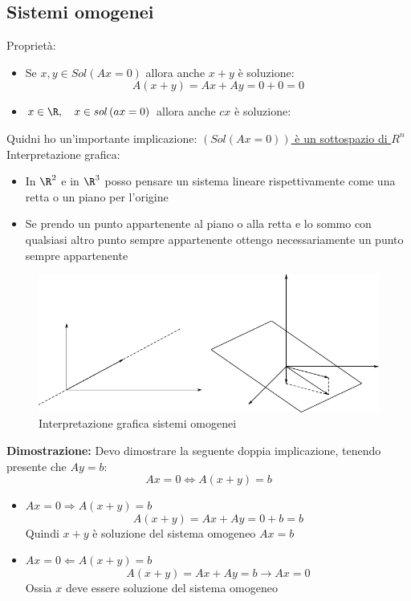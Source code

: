\documentclass[12pt,a4paper,oneside]{article}
\begin{document}
\subsection{Sistemi omogenei}
Proprietà:
\begin{itemize}
	\item Se $x,y \in  Sol\left( Ax=0 \right) $ allora anche $x+y$ è soluzione:
	      \[
		      A\left( x+y \right)  = Ax + Ay = 0 + 0 = 0
	      \]
	\item $x \in  \R, \quad  x \in  sol \left(  ax = 0 \right) $ allora anche $cx$ è soluzione:
\end{itemize}
Quidni ho un'importante implicazione:  \underline{ $ \left( Sol\left( Ax=0 \right)  \right) $ è un sottospazio di $R^{n}$}
\vskip3mm
Interpretazione grafica:
\begin{itemize}
	\item In $\R^{2}$ e in $\R^{3}$ posso pensare un sistema lineare rispettivamente come una retta o un piano per l'origine
	\item Se prendo un punto appartenente al piano o alla retta e lo sommo con qualsiasi altro punto sempre appartenente ottengo necessariamente un punto sempre appartenente
\end{itemize}
\begin{figure}[H]
	\centering
	\includegraphics{Images/Sistemi omogenei.pdf}
	\caption{Interpretazione grafica sistemi omogenei}
\end{figure}
\textbf{Dimostrazione:}
Devo dimostrare la seguente doppia implicazione, tenendo presente che $ Ay=b $:
\[
	Ax =0 \Leftrightarrow A \left( x + y \right) = b
\]
\begin{itemize}
	\item $ Ax =0 \Rightarrow A\left( x+y \right) =b $
	      \[
		      A\left( x+y \right) = Ax+Ay =  0+b = b
	      \]
	      Quindi $x+y$ è soluzione del sistema omogeneo $Ax=b$
	\item $ Ax =0 \Leftarrow A\left( x+y \right) =b $
	      \[
		      A\left( x+y \right) = Ax + Ay = b \rightarrow Ax = 0
	      \]
	      Ossia $ x $ deve essere soluzione del sistema omogeneo
\end{itemize}
\end{document}
